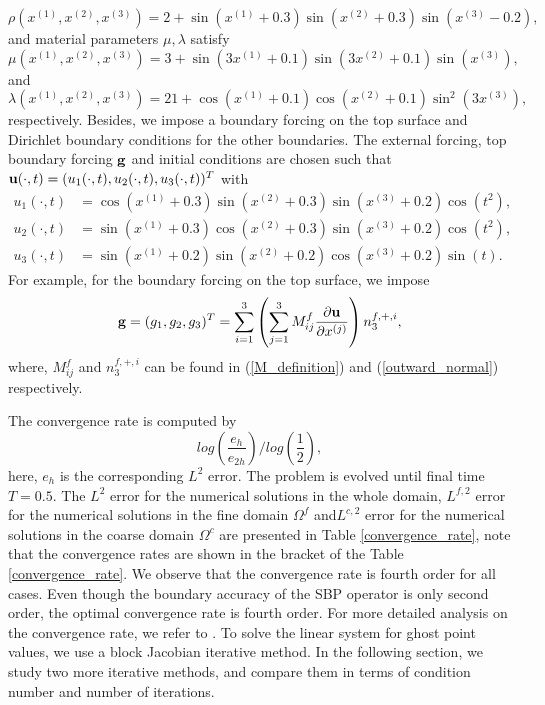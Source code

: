 \begin{equation}\label{density_function}
\rho(x^{(1)},x^{(2)},x^{(3)}) = 2 + \sin(x^{(1)}+0.3)\sin(x^{(2)}+0.3)\sin(x^{(3)}-0.2),
\end{equation}
and material parameters $\mu, \lambda$ satisfy
\begin{equation}\label{mu_function}
\mu(x^{(1)},x^{(2)},x^{(3)}) = 3 + \sin(3x^{(1)}+0.1)\sin(3x^{(2)}+0.1)\sin(x^{(3)}),
\end{equation}
and 
\begin{equation}\label{lambda_function}
\lambda(x^{(1)},x^{(2)},x^{(3)})  = 21+ \cos(x^{(1)}+0.1)\cos(x^{(2)}+0.1)\sin^2(3x^{(3)}),
\end{equation}
respectively. Besides, we impose a boundary forcing on the top surface and Dirichlet boundary conditions for the other boundaries. The external forcing, top boundary forcing ${\bf g}$ and initial conditions are chosen such that ${\bf u}(\cdot,t) = (u_1(\cdot,t),u_2(\cdot,t),u_3(\cdot,t))^T$ with
\begin{align*}
u_1(\cdot,t) &= \cos(x^{(1)}+0.3)\sin(x^{(2)}+0.3)\sin(x^{(3)}+0.2)\cos(t^2),\\
u_2(\cdot,t) &= \sin(x^{(1)}+0.3)\cos(x^{(2)}+0.3)\sin(x^{(3)}+0.2)\cos(t^2),\\
u_3(\cdot,t) &= \sin(x^{(1)}+0.2)\sin(x^{(2)}+0.2)\cos(x^{(3)}+0.2)\sin(t).
\end{align*}
For example, for the boundary forcing on the top surface, we impose 
\begin{equation}\label{traction_force}
{\bf g} = (g_1,g_2,g_3)^T = \sum_{i=1}^3\left(\sum_{j = 1}^3 M_{ij}^f\frac{\partial{\bf u}}{\partial x^{(j)}}\right) n^{f,+,i}_3,
\end{equation}
where, $M_{ij}^f$ and $n^{f,+,i}_3 $ can be found in (\ref{M_definition}) and (\ref{outward_normal}) respectively.

The convergence rate is computed by
\[log\left(\frac{e_h}{e_{2h}}\right)\Bigg/log\left(\frac{1}{2}\right),\]
here, $e_h$ is the corresponding $L^2$ error.  The problem is evolved until final time $T = 0.5$. The $L^2$ error for the numerical solutions in the whole domain, $L^{f,2}$ error for the numerical solutions in the fine domain $\Omega^f$ and$L^{c,2}$ error for the numerical solutions in the coarse domain $\Omega^c$ are presented in Table \ref{convergence_rate}, note that the convergence rates are shown in the bracket of the Table \ref{convergence_rate}. We observe that the convergence rate is fourth order for all cases. Even though the boundary accuracy of the SBP operator is only  second order, the optimal convergence rate is fourth order. For more detailed analysis on the convergence rate, we refer to \cite{Wang2017,Wang2018b}.  To solve the linear system for ghost point values, we use a block Jacobian iterative method. In the following section, we study two more iterative methods, and compare them in terms of condition number and number of iterations.

